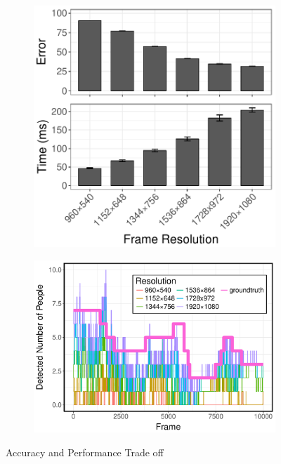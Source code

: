 \begin{figure}
  \centering
  \begin{subfigure}{.42\columnwidth}
    \centering
    \includegraphics[width=.90\linewidth]{figures/accuracy-performance.pdf}
    \label{fig:a-vs-p}
  \end{subfigure}
  \begin{subfigure}{.54\columnwidth}
    \centering
    \includegraphics[width=.95\linewidth]{figures/time-series.pdf}
    \label{fig:detect-ts}
  \end{subfigure}
  \caption{Accuracy and Performance Trade off}
  \label{fig:bw}
\end{figure}


